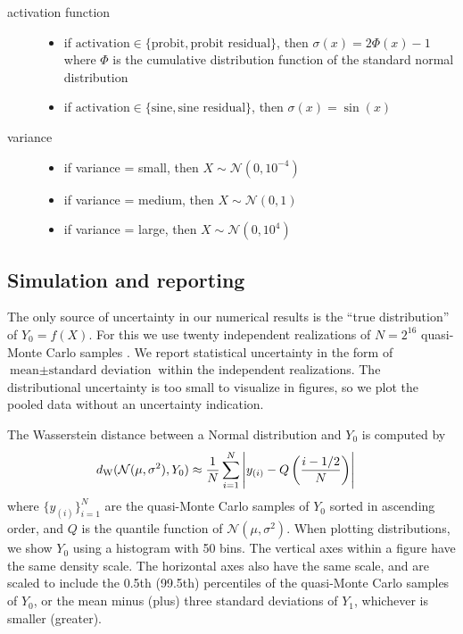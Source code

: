 \documentclass{article}
\begin{document}
\begin{description}
\begin{itemize}
  \end{itemize}
  \item[activation function] 
  \begin{itemize}
    \item if \(\text{activation} \in \{\text{probit}, \text{probit residual}\}\), then \(\sigma(x) = 2\Phi(x) - 1\) where \(\Phi\) is the cumulative distribution function of the standard normal distribution
    \item if \(\text{activation} \in \{\text{sine}, \text{sine residual}\}\), then \(\sigma(x) = \sin(x)\)
  \end{itemize}
  \item[variance]
  \begin{itemize}
    \item if variance = small, then \(X \sim \mathcal N(0, 10^{-4})\)
    \item if variance = medium, then \(X \sim \mathcal N(0, 1)\)
    \item if variance = large, then \(X \sim \mathcal N(0, 10^4)\)
  \end{itemize}
\end{description}

\subsection*{Simulation and reporting}
The only source of uncertainty in our numerical results is the ``true distribution'' of \(Y_0=f(X)\).
For this we use twenty independent realizations of \(N=2^{16}\) quasi-Monte Carlo samples \citep{virtanen_scipy_2020}.
We report statistical uncertainty in the form of \(\text{mean} \pm \text{standard deviation}\) within the independent realizations.
The distributional uncertainty is too small to visualize in figures, so we plot the pooled data without an uncertainty indication.

The Wasserstein distance between a Normal distribution and \(Y_0\) is computed by
\begin{align*}
  d_\mathrm{W}(\mathcal N(\mu, \sigma^2), Y_0) 
  &\approx \frac{1}{N}\sum_{i=1}^N \left|y_{(i)} - Q\del{\frac{i -1/2}{N}}\right|
\end{align*}
where \(\{y_{(i)}\}_{i=1}^N\) are the quasi-Monte Carlo samples of \(Y_0\) sorted in ascending order, and \(Q\) is the quantile function of \(\mathcal N(\mu, \sigma^2)\).
When plotting distributions, we show \(Y_0\) using a histogram with 50 bins.
The vertical axes within a figure have the same density scale.
The horizontal axes also have the same scale, and are scaled to include the 0.5th (99.5th) percentiles of the quasi-Monte Carlo samples of \(Y_0\), or the mean minus (plus) three standard deviations of \(Y_1\), whichever is smaller (greater).
\end{document}
